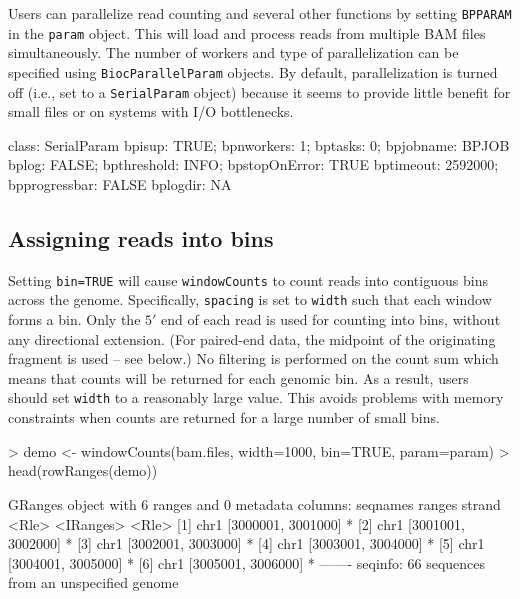 \documentclass[12pt]{report}
\renewenvironment{Schunk}{\vspace{0pt}}{\vspace{0pt}}
\newcommand{\code}[1]{{\small\texttt{#1}}}
\begin{document}
Users can parallelize read counting and several other functions by setting \code{BPPARAM} in the \code{param} object.
This will load and process reads from multiple BAM files simultaneously.
The number of workers and type of parallelization can be specified using \code{BiocParallelParam} objects.
By default, parallelization is turned off (i.e., set to a \code{SerialParam} object) because it seems to provide little benefit for small files or on systems with I/O bottlenecks.

\begin{Schunk}
\begin{Soutput}
class: SerialParam
  bpisup: TRUE; bpnworkers: 1; bptasks: 0; bpjobname: BPJOB
  bplog: FALSE; bpthreshold: INFO; bpstopOnError: TRUE
  bptimeout: 2592000; bpprogressbar: FALSE
  bplogdir: NA
\end{Soutput}
\end{Schunk}

\subsection{Assigning reads into bins}
Setting \code{bin=TRUE} will cause \code{windowCounts} to count reads into contiguous bins across the genome.
Specifically, \code{spacing} is set to \code{width} such that each window forms a bin.
Only the $5'$ end of each read is used for counting into bins, without any directional extension.
(For paired-end data, the midpoint of the originating fragment is used -- see below.)
No filtering is performed on the count sum which means that counts will be returned for each genomic bin. 
As a result, users should set \code{width} to a reasonably large value.
This avoids problems with memory constraints when counts are returned for a large number of small bins.

\begin{Schunk}
\begin{Sinput}
> demo <- windowCounts(bam.files, width=1000, bin=TRUE, param=param)
> head(rowRanges(demo))
\end{Sinput}
\begin{Soutput}
GRanges object with 6 ranges and 0 metadata columns:
      seqnames             ranges strand
         <Rle>          <IRanges>  <Rle>
  [1]     chr1 [3000001, 3001000]      *
  [2]     chr1 [3001001, 3002000]      *
  [3]     chr1 [3002001, 3003000]      *
  [4]     chr1 [3003001, 3004000]      *
  [5]     chr1 [3004001, 3005000]      *
  [6]     chr1 [3005001, 3006000]      *
  -------
  seqinfo: 66 sequences from an unspecified genome
\end{Soutput}
\end{Schunk}
\end{document}
